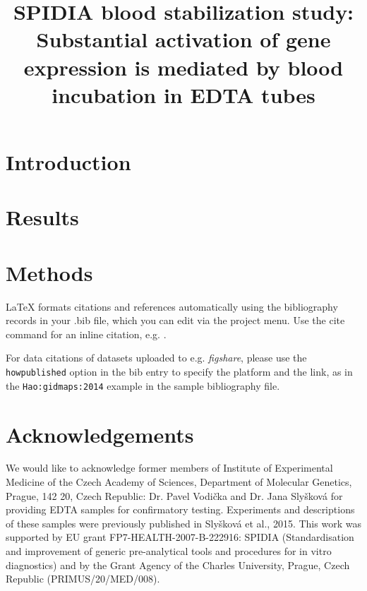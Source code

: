 \documentclass[fleqn,10pt]{wlscirep}
\title{SPIDIA blood stabilization study: Substantial activation of gene expression is mediated by blood incubation in EDTA tubes}
\begin{document}
\flushbottom
\maketitle
%
%
\thispagestyle{empty}

\noindent 

\section*{Introduction}


\section*{Results}
%
%

\section*{Methods}
%



\noindent 
LaTeX formats citations and references automatically using the bibliography records in your .bib file, which you can edit via the project menu. Use the cite command for an inline citation, e.g.  \cite{Hao:gidmaps:2014}.

For data citations of datasets uploaded to e.g. \emph{figshare}, please use the \verb|howpublished| option in the bib entry to specify the platform and the link, as in the \verb|Hao:gidmaps:2014| example in the sample bibliography file.

\section*{Acknowledgements}

We would like to acknowledge former members of Institute of Experimental Medicine of the Czech Academy of Sciences, Department of Molecular Genetics, Prague, 142 20, Czech Republic: Dr. Pavel Vodička and Dr. Jana Slyšková for providing EDTA samples for confirmatory testing. Experiments and descriptions of these samples were previously published in Slyšková et al., 2015.
This work was supported by EU grant FP7-HEALTH-2007-B-222916: SPIDIA (Standardisation and improvement of generic pre-analytical tools and procedures for in vitro diagnostics) and by the Grant Agency of the Charles University, Prague, Czech Republic (PRIMUS/20/MED/008). 
\end{document}
